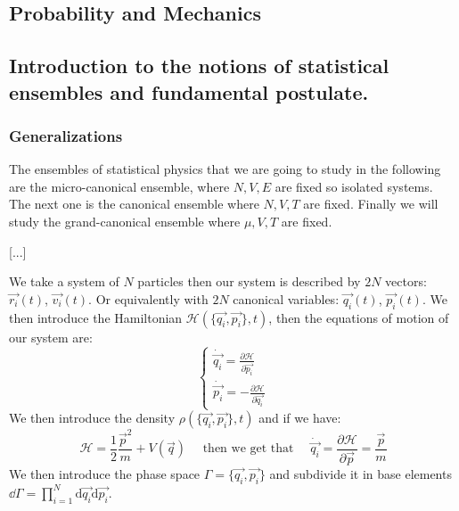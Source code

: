 \documentclass[10pt,a4paper]{book}
\begin{document}
\subsection{Probability and Mechanics}


\subsection{Introduction to the notions of statistical ensembles and fundamental postulate.}
\subsubsection{Generalizations}
The ensembles of statistical physics that we are going to study in the following are the micro-canonical ensemble, where $N, V, E$ are fixed so isolated systems. The next one is the canonical ensemble where $N, V, T$ are fixed. Finally we will study the grand-canonical ensemble where $\mu, V, T$ are fixed.

[...]

We take a system of $N$ particles then our system is described by $2N$ vectors: $\overrightarrow{r_i}(t)$, $\overrightarrow{v_i}(t)$. Or equivalently with $2N$ canonical variables: $\overrightarrow{q_i}(t)$, $\overrightarrow{p_i}(t)$. We then introduce the Hamiltonian $\mathcal{H}(\{\overrightarrow{q_i}, \overrightarrow{p_i}\}, t)$, then the equations of motion of our system are:
\[
\begin{cases}
\dot{\overrightarrow{q_i}} = \frac{\partial \mathcal{H}}{\partial \overrightarrow{p_i}}\\
\dot{\overrightarrow{p_i}} = - \frac{\partial \mathcal{H}}{\partial \overrightarrow{q_i}}
\end{cases}
\]
We then introduce the density $\rho(\{\overrightarrow{q_i}, \overrightarrow{p_i}\}, t)$ and if we have:
\[
\mathcal{H} = \frac{1}{2}\frac{\overrightarrow{p}^2}{m} + V(\overrightarrow{q}) \quad \text{ then we get that } \quad \dot{\overrightarrow{q_i}} = \frac{\partial \mathcal{H}}{\partial \overrightarrow{p}} = \frac{\overrightarrow{p}}{m}
\]
We then introduce the phase space $\Gamma = \{\overrightarrow{q_i}, \overrightarrow{p_i}\}$ and subdivide it in base elements $\dd\Gamma = \prod_{i = 1}^N \text{d}\overrightarrow{q_i}\text{d}\overrightarrow{p_i}$.
\end{document}
